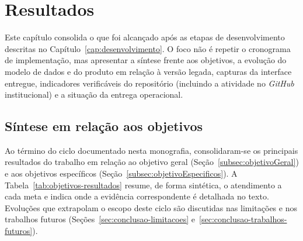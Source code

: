 \chapter{Resultados}\label{cap:resultados}

Este capítulo consolida o que foi alcançado após as etapas de desenvolvimento descritas no Capítulo~\ref{cap:desenvolvimento}. O foco não é repetir o cronograma de implementação, mas apresentar a síntese frente aos objetivos, a evolução do modelo de dados e do produto em relação à versão legada, capturas da interface entregue, indicadores verificáveis do repositório (incluindo a atividade no \textit{GitHub} institucional) e a situação da entrega operacional.


\section{Síntese em relação aos objetivos}\label{sec:resultados-objetivos}

Ao término do ciclo documentado nesta monografia, consolidaram-se os principais resultados do trabalho em relação ao objetivo geral (Seção~\ref{subsec:objetivoGeral}) e aos objetivos específicos (Seção~\ref{subsec:objetivoEspecificos}). A Tabela~\ref{tab:objetivos-resultados} resume, de forma sintética, o atendimento a cada meta e indica onde a evidência correspondente é detalhada no texto. Evoluções que extrapolam o escopo deste ciclo são discutidas nas limitações e nos trabalhos futuros (Seções~\ref{sec:conclusao-limitacoes} e~\ref{sec:conclusao-trabalhos-futuros}).

